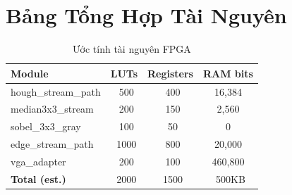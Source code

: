 \documentclass[12pt,a4paper]{article}
\begin{document}
\section{Bảng Tổng Hợp Tài Nguyên}

\begin{table}[h]
\centering
\begin{tabular}{|l|c|c|c|}
\hline
\textbf{Module} & \textbf{LUTs} & \textbf{Registers} & \textbf{RAM bits} \\
\hline
hough\_stream\_path & ~500 & ~400 & 16,384 \\
median3x3\_stream & ~200 & ~150 & 2,560 \\
sobel\_3x3\_gray & ~100 & ~50 & 0 \\
edge\_stream\_path & ~1000 & ~800 & 20,000 \\
vga\_adapter & ~200 & ~100 & 460,800 \\
\hline
\textbf{Total (est.)} & ~2000 & ~1500 & ~500KB \\
\hline
\end{tabular}
\caption{Ước tính tài nguyên FPGA}
\end{table}
\end{document}
